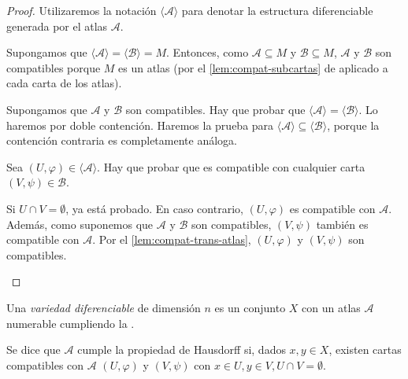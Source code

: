 \documentclass[../VD.tex]{subfiles}
\begin{document}
\begin{proof}
  Utilizaremos la notación \(\langle  \mathcal{A} \rangle\) para denotar la estructura
  diferenciable generada por el atlas \(\mathcal{A}\).

  \begin{subproof}[\(\implies\)]
    Supongamos que \(\langle \mathcal{A} \rangle = \langle \mathcal{B} \rangle = M\). Entonces, como
    \(\mathcal{A} \subseteq M\) y \(\mathcal{B} \subseteq M\), \(\mathcal{A}\) y
    \(\mathcal{B}\) son compatibles porque \(M\) es un atlas (por el
    \cref{lem:compat-subcartas} de  aplicado a
    cada carta de los atlas).
  \end{subproof}

  \begin{subproof}[\(\impliedby\)]
    Supongamos que \(\mathcal{A}\) y \(\mathcal{B}\) son compatibles. Hay que
    probar que \(\langle \mathcal{A} \rangle = \langle \mathcal{B} \rangle\). Lo
    haremos por doble contención. Haremos la prueba para \(\langle \mathcal{A}
    \rangle \subseteq \langle \mathcal{B} \rangle\), porque la contención
    contraria es completamente análoga.

    Sea \((U, \varphi) \in
    \langle \mathcal{A} \rangle\). Hay que probar que es compatible con
    cualquier carta \((V,\psi) \in \mathcal{B}\).

      Si \(U \cap V = \emptyset\), ya está probado. En caso contrario,
      \((U,\varphi)\) es compatible con \(\mathcal{A}\). Además, como suponemos
      que \(\mathcal{A}\) y \(\mathcal{B}\) son compatibles, \((V,\psi)\)
      también es compatible con \(\mathcal{A}\). Por el
      \cref{lem:compat-trans-atlas}, \((U,\varphi)\) y \((V,\psi)\) son
      compatibles.
  \end{subproof}
\end{proof}

\begin{definition}
  \label{def:vd}
  Una \emph{variedad diferenciable} de dimensión \(n\) es un conjunto \(X\) con
  un atlas \(\mathcal{A}\) numerable cumpliendo la .

\end{definition}

\begin{definition}
  \label{def:Hausdorff}
  Se dice que \(\mathcal{A}\) cumple la propiedad de Hausdorff si, dados \(x,y
  \in X\), existen cartas compatibles con \(\mathcal{A}\) \((U, \varphi)\) y
  \((V, \psi)\) con \(x \in U, y \in V, U \cap V = \emptyset\).
\end{definition}
\end{document}
